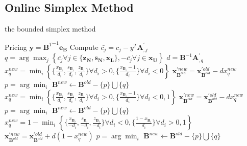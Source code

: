 \documentclass{llncs}
\begin{document}
\subsection{Online Simplex Method}
\begin{algorithm}
\caption{the bounded simplex method}

Pricing $\mathbf{y} = {\mathbf{B}^T}^{-1}\mathbf{e_B}$\;
Compute $\bar{c_j} = c_j - y^T\mathbf{A}_{,j}^{'}$\;
{
    $q = \arg\max_{j} \left\{\bar{c_j} \forall j\in\{\mathbf{z_N}, \mathbf{s_N}, \mathbf{x_L}  \},-\bar{c_j} \forall j\in\mathbf{x_U}  \right\}$\;
    $d = \mathbf{B}^{-1}\mathbf{A}_{,q}^{'}$\;
    {
        $x_q^{new} = \min_i \left\{\{\frac{x_{\mathbf{B}_{i}}}{d_i}, \frac{s_{\mathbf{B}_{i}}}{d_i}, \frac{z_{\mathbf{B}_{i}}}{d_i}\} \forall d_i>0,\{\frac{x_{\mathbf{B}_{i}}-1}{d_i}\} \forall d_i<0\right\}$\;
        $\mathbf{x}_{\mathbf{B}^{old}}^{'new} = \mathbf{x}_{\mathbf{B}^{old}}^{'old} - dx_q^{new}$\;
        $p=\arg\min_{i}$\;
        $\mathbf{B}^{new} \leftarrow \mathbf{B}^{old} - \{p\} \bigcup \{q\}$\;
    }
    {
        $x_q^{new} = \min_i \left\{\{\frac{x_{\mathbf{B}_{i}}}{d_i}, \frac{s_{\mathbf{B}_{i}}}{d_i}, \frac{z_{\mathbf{B}_{i}}}{d_i}\} \forall d_i>0, \{\frac{x_{\mathbf{B}_{i}}-1}{d_i}\} \forall d_i<0, 1 \right\}$\;
        $\mathbf{x}_{\mathbf{B}^{old}}^{'new} = \mathbf{x}_{\mathbf{B}^{old}}^{'old} - dx_q^{new}$\; 
        {
            $p=\arg\min_{i}$\;
            $\mathbf{B}^{new} \leftarrow \mathbf{B}^{old} - \{p\} \bigcup \{q\}$\;
        }
    }
    {
        $x_q^{new} = 1 - \min_i \left\{\{\frac{x_{\mathbf{B}_{i}}}{-d_i}, \frac{s_{\mathbf{B}_{i}}}{-d_i}, \frac{z_{\mathbf{B}_{i}}}{-d_i}\} \forall d_i<0, \{\frac{1-x_{\mathbf{B}_{i}}}{d_i}\} \forall d_i>0, 1 \right\}$\;
        $\mathbf{x}_{\mathbf{B}^{old}}^{'new} = \mathbf{x}_{\mathbf{B}^{old}}^{'old} + d(1-x_q^{new})$\;
        {
            $p=\arg\min_{i}$\;
            $\mathbf{B}^{new} \leftarrow \mathbf{B}^{old} - \{p\} \bigcup \{q\}$\;
        }
    }
}

\end{algorithm}
\end{document}
